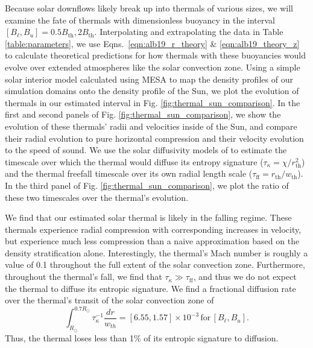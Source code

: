 Because solar downflows likely break up into thermals of various sizes, we will examine the fate of thermals with dimensionless buoyancy in the interval $[B_\ell, B_u] = 0.5B_\text{th}, 2B_\text{th}$.
Interpolating and extrapolating the data in Table \ref{table:parameters}, we use Eqns.~\ref{eqn:alb19_r_theory} \& \ref{eqn:alb19_theory_z} to calculate theoretical predictions for how thermals with these buoyancies would evolve over extended atmospheres like the solar convection zone.
Using a simple solar interior model calculated using MESA \citep{paxton&all2011} to map the density profiles of our simulation domains onto the density profile of the Sun, we plot the evolution of thermals in our estimated interval in Fig. \ref{fig:thermal_sun_comparison}.
In the first and second panels of Fig. \ref{fig:thermal_sun_comparison}, we show the evolution of these thermals' radii and velocities inside of the Sun, and compare their radial evolution to pure horizontal compression and their velocity evolution to the speed of sound.
We use the solar diffusivity models of \citet{brown2011} to estimate the timescale over which the thermal would diffuse its entropy signature ($\tau_\kappa = \chi/r_{\text{th}}^2$) and the thermal freefall timescale over its own radial length scale ($\tau_{\text{ff}} = r_{\text{th}}/w_{\text{th}}$).
In the third panel of Fig. \ref{fig:thermal_sun_comparison}, we plot the ratio of these two timescales over the thermal's evolution.

We find that our estimated solar thermal is likely in the falling regime.
These thermals experience radial compression with corresponding increases in velocity, but experience much less compression than a naive approximation based on the density stratification alone.
Interestingly, the thermal's Mach number is roughly a value of 0.1 throughout the full extent of the solar convection zone.
Furthermore, throughout the thermal's fall, we find that $\tau_\kappa \gg \tau_{\text{ff}}$, and thus we do not expect the thermal to diffuse its entropic signature.
We find a fractional diffusion rate over the thermal's transit of the solar convection zone of 
$$
\int_{R_\odot}^{0.7 R_\odot} \tau_\kappa^{-1} \frac{dr}{w_{th}} = [6.55, 1.57]\times 10^{-3}\,\text{for}\,[B_\ell, B_u].
$$
Thus, the thermal loses less than 1\% of its entropic signature to diffusion.

